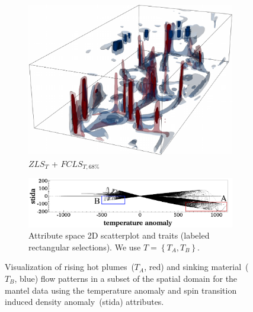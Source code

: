 \begin{figure}[!h]
\begin{subfigure}{0.23\linewidth}
\includegraphics[width=\linewidth]{Images/Mantel/fcls_68.pdf}
\vspace{-5mm}
\caption{$ZLS_{T}$ + $FCLS_{T,68\%}$}
\label{fig:mantel_fcls}
\end{subfigure}
\hfill
\begin{subfigure}{0.28\linewidth}
\centering
\includegraphics[width=\linewidth]{Images/Mantel/scatterplot.pdf}
\caption{Attribute space 2D scatterplot and traits (labeled rectangular selections). We use $T = \left\{T_{A}, T_{B}\right\}$.} 
\label{fig:mantel_scatterplot}
\end{subfigure}
\vspace{-2mm}
\caption{Visualization of rising hot plumes~($T_{A}$, red) and sinking material~($T_{B}$, blue) flow patterns in a subset of the spatial domain for the mantel data using the temperature anomaly and spin transition induced density anomaly~(stida) attributes.}
\label{fig:mantel}
\end{figure}

